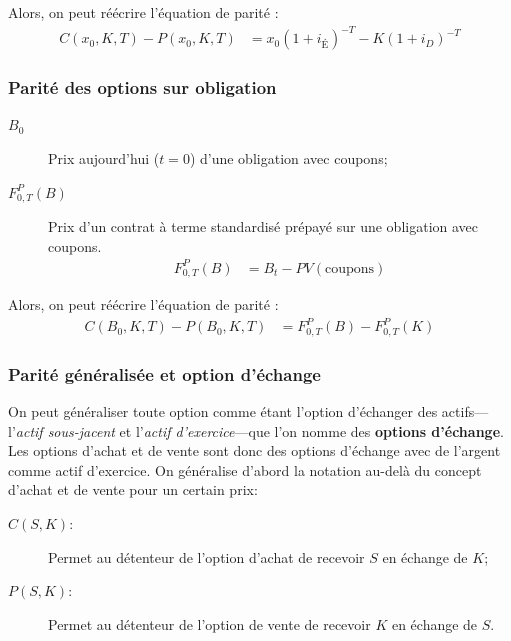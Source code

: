 \documentclass[10pt, french]{article}
\begin{document}
\begin{multicols*}{2}
Alors, on peut réécrire l'équation de parité : 
\begin{align*}
	C(x_0, K,T) - P(x_0, K, T) 
	&= 	x_0 (1 + i_{\text{É}})^{-T} - K(1 + i_D)^{-T}
\end{align*}

\subsubsection*{Parité des options sur obligation}
\begin{description}
	\item[$B_{0}$]	Prix aujourd'hui ($t = 0$) d'une obligation avec coupons;
	\item[$F_{0, T}^{P}(B)$]	Prix d'un contrat à terme standardisé prépayé sur une obligation avec coupons.
		\setlength{\mathindent}{-1cm}
		\begin{align*}
		F_{0, T}^{P}(B) 
		&=	B_{t} - PV(\text{coupons})
		\end{align*}
		\setlength{\mathindent}{1cm}
\end{description}

Alors, on peut réécrire l'équation de parité : 
\begin{align*}
	C(B_{0}, K, T) - P(B_{0}, K, T) 
	&= 	F_{0, T}^{P}(B) - F_{0, T}^{P}(K)
\end{align*}

\subsubsection*{Parité généralisée et option d'échange}
On peut généraliser toute option comme étant l'option d'échanger des actifs---l'\textit{actif sous-jacent} et l'\textit{actif d'exercice}---que l'on nomme des \textbf{options d'échange}.\\

Les options d'achat et de vente sont donc des options d'échange avec de l'argent comme actif d'exercice. On généralise d'abord la notation au-delà du concept d'achat et de vente pour un certain prix:
\begin{distributions}[Notation]
\begin{description}
	\item[$C(S, K)$:] Permet au détenteur de l'option d'achat de recevoir $S$ en échange de $K$;
	\item[$P(S, K)$:] Permet au détenteur de l'option de vente de recevoir $K$ en échange de $S$.
\end{description}
\end{distributions}


\end{multicols*}
\end{document}
